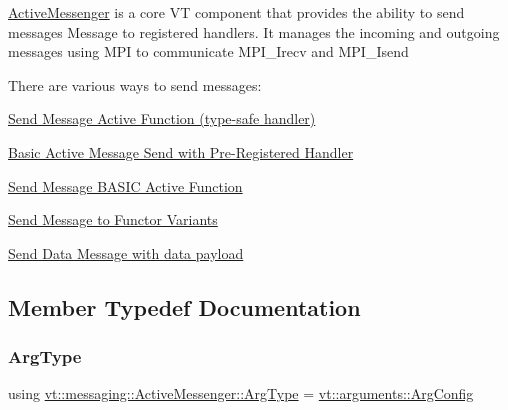 \hyperlink{structvt_1_1messaging_1_1_active_messenger}{Active\+Messenger} is a core VT component that provides the ability to send messages {\ttfamily Message} to registered handlers. It manages the incoming and outgoing messages using M\+PI to communicate {\ttfamily M\+P\+I\+\_\+\+Irecv} and {\ttfamily M\+P\+I\+\_\+\+Isend} 

There are various ways to send messages\+:
\begin{DoxyItemize}
\item \hyperlink{group__typesafehan}{Send Message Active Function (type-\/safe handler)}
\item \hyperlink{group__preregister}{Basic Active Message Send with Pre-\/\+Registered Handler}
\item \hyperlink{group__basicsend}{Send Message B\+A\+S\+IC Active Function}
\item \hyperlink{group__functorsend}{Send Message to Functor Variants}
\item \hyperlink{group__sendpayload}{Send Data Message with data payload} 
\end{DoxyItemize}

\subsection{Member Typedef Documentation}
\mbox{\label{structvt_1_1messaging_1_1_active_messenger_a62cdeb842610617f316e6b20c19c5031}} 
\subsubsection{\texorpdfstring{Arg\+Type}{ArgType}}
{\footnotesize\ttfamily using \hyperlink{structvt_1_1messaging_1_1_active_messenger_a62cdeb842610617f316e6b20c19c5031}{vt\+::messaging\+::\+Active\+Messenger\+::\+Arg\+Type} =  \hyperlink{structvt_1_1arguments_1_1_arg_config}{vt\+::arguments\+::\+Arg\+Config}}

\mbox{\label{structvt_1_1messaging_1_1_active_messenger_a80a9cbda399d7bf035bfcecc761f4b02}} 
